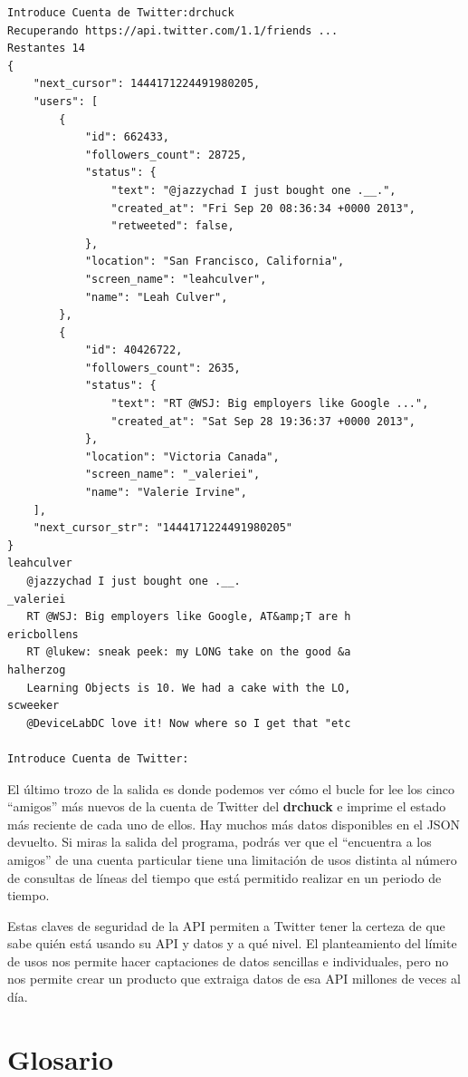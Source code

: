 \beforeverb
\begin{verbatim}
Introduce Cuenta de Twitter:drchuck
Recuperando https://api.twitter.com/1.1/friends ...
Restantes 14
{
    "next_cursor": 1444171224491980205, 
    "users": [
        {
            "id": 662433, 
            "followers_count": 28725, 
            "status": {
                "text": "@jazzychad I just bought one .__.", 
                "created_at": "Fri Sep 20 08:36:34 +0000 2013", 
                "retweeted": false, 
            }, 
            "location": "San Francisco, California", 
            "screen_name": "leahculver", 
            "name": "Leah Culver", 
        }, 
        {
            "id": 40426722, 
            "followers_count": 2635, 
            "status": {
                "text": "RT @WSJ: Big employers like Google ...", 
                "created_at": "Sat Sep 28 19:36:37 +0000 2013", 
            }, 
            "location": "Victoria Canada", 
            "screen_name": "_valeriei", 
            "name": "Valerie Irvine", 
    ], 
    "next_cursor_str": "1444171224491980205"
}
leahculver
   @jazzychad I just bought one .__.
_valeriei
   RT @WSJ: Big employers like Google, AT&amp;T are h
ericbollens
   RT @lukew: sneak peek: my LONG take on the good &a
halherzog
   Learning Objects is 10. We had a cake with the LO,
scweeker
   @DeviceLabDC love it! Now where so I get that "etc

Introduce Cuenta de Twitter:
\end{verbatim}
\afterverb
%
El último trozo de la salida es donde podemos ver cómo el bucle for lee los
cinco ``amigos'' más nuevos de la cuenta de Twitter del {\bf drchuck}
e imprime el estado más reciente de cada uno de ellos. Hay
muchos más datos disponibles en el JSON devuelto. Si miras
la salida del programa, podrás ver que el ``encuentra a los amigos''
de una cuenta particular tiene una limitación de usos distinta al
número de consultas de líneas del tiempo que está permitido realizar en un periodo de tiempo.

Estas claves de seguridad de la API permiten a Twitter tener la certeza de que
sabe quién está usando su API y datos y a qué nivel. El planteamiento del
límite de usos nos permite hacer captaciones de datos sencillas e individuales, pero
no nos permite crear un producto que extraiga datos de esa API
millones de veces al día.

\section{Glosario}


